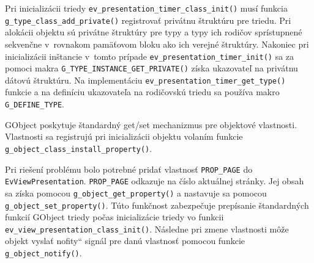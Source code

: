 \documentclass[12pt,oneside,final]{fithesis2}
\newcommand\uv[1]{\quotedblbase #1\textquotedblleft}
\begin{document}
Pri inicializácii triedy \texttt{ev\_presentation\_timer\_class\_init()} musí funkcia \texttt{g\_type\_class\_add\_private()} registrovať privátnu štruktúru pre triedu\cite{gprivate}. Pri alokácii objektu sú privátne štruktúry pre typy a typy ich rodičov sprístupnené sekvenčne v~rovnakom pamäťovom bloku ako ich verejné štruktúry. Nakoniec pri inicializácii inštancie v~tomto prípade \texttt{ev\_presentation\_timer\_init()} sa za pomoci makra \texttt{G\_TYPE\_INSTANCE\_GET\_PRIVATE()} získa ukazovateľ na privátnu dátovú štruktúru. Na implementáciu \texttt{ev\_presentation\_timer\_get\_type()} funkcie a na definíciu ukazovateľa na rodičovskú triedu sa používa makro \texttt{G\_DEFINE\_TYPE}.

GObject poskytuje štandardný get/set mechanizmus pre objektové vlastnosti. Vlastnosti sa registrujú pri inicializácii objektu volaním funkcie \texttt{g\_object\_class\_install\_property()}.

Pri riešení problému bolo potrebné pridať vlastnosť \texttt{PROP\_PAGE} do \texttt{EvViewPresentation}. \texttt{PROP\_PAGE} odkazuje na číslo aktuálnej stránky. Jej obsah sa získa pomocou \texttt{g\_object\_get\_property()} a nastavuje sa pomocou \texttt{g\_object\_set\_property()}. Túto funkčnost zabezpečuje prepísanie štandardných funkcií GObject triedy počas inicializácie triedy vo funkcii \texttt{ev\_view\_presentation\_class\_init()}. Následne pri zmene vlastnosti môže objekt vyslať \uv{nofity} signál pre danú vlastnosť pomocou funkcie \texttt{g\_object\_notify()}.
\end{document}
